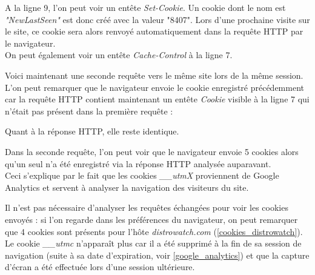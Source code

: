 \begin{singlespacing}

\end{singlespacing}
A la ligne 9, l'on peut voir un entête \textit{Set-Cookie}. Un cookie dont le nom est \textit{"NewLastSeen"} est donc créé avec la valeur "8407". Lors d'une prochaine visite sur le site, ce cookie sera alors renvoyé automatiquement dans la requête HTTP par le navigateur.\\
On peut également voir un entête \textit{Cache-Control} à la ligne 7.
\newline

Voici maintenant une seconde requête vers le même site lors de la même session. L'on peut remarquer que le navigateur envoie le cookie enregistré précédemment car la requête HTTP contient maintenant un entête \textit{Cookie} visible à la ligne 7 qui n'était pas présent dans la première requête :

\begin{singlespacing}

\end{singlespacing}

Quant à la réponse HTTP, elle reste identique.
\newline

Dans la seconde requête, l'on peut voir que le navigateur envoie 5 cookies alors qu'un seul n'a été enregistré via la réponse HTTP analysée auparavant.\\
Ceci s'explique par le fait que les cookies \textit{\_\_utmX} proviennent de Google Analytics \cite{Google_Analytics_cookies} et servent à analyser la navigation des visiteurs du site.
\newline

Il n'est pas nécessaire d'analyser les requêtes échangées pour voir les cookies envoyés : si l'on regarde dans les préférences du navigateur, on peut remarquer que 4 cookies sont présents pour l'hôte \textit{distrowatch.com} (\autoref{cookies_distrowatch}). Le cookie \textit{\_\_utmc} n'apparaît plus car il a été supprimé à la fin de sa session de navigation (suite à sa date d'expiration, voir \autoref{google_analytics}) et que la capture d'écran a été effectuée lors d'une session ultérieure.

